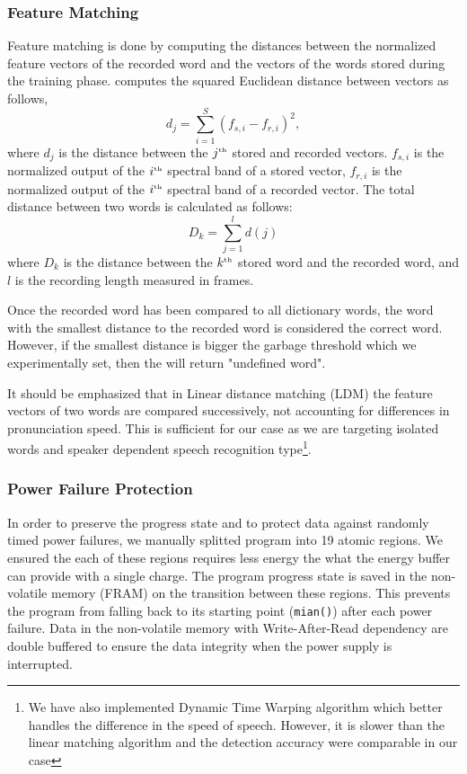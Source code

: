 \subsubsection{Feature Matching}
Feature matching is done by computing the distances between the normalized feature vectors of the recorded word and the vectors of the words stored during the training phase. 
\cim computes the squared Euclidean distance between vectors as follows,
\begin{equation}
	 	d_j = \sum\limits^S_{i=1} (f_{s,i} - f_{r,i})^2,
    \label{eq:frame_dist}
\end{equation}
where $d_j$ is the distance between the $j^{\text{\tiny th}}$ stored and recorded vectors. $f_{s,i}$ is the normalized output of the $i^{\text{\tiny th}}$ spectral band of a stored vector, $f_{r,i}$ is the normalized output of the $i^{\text{\tiny th}}$ spectral band of a recorded vector. 
The total distance between two words is calculated as follows:
\begin{equation}
		D_k = \sum\limits^{l}_{j=1} d(j)
\end{equation}
where $D_k$ is the distance between the $k^{\text{\tiny th}}$ stored word and the recorded word, and $l$ is the recording length measured in frames.

Once the recorded word has been compared to all \cim dictionary words, the word with the smallest distance to the recorded word is considered the correct word. However, if the smallest distance is bigger the garbage threshold  which we experimentally set, then the \cim will return "undefined word". 

It should be emphasized that in Linear distance matching (LDM) the feature vectors of two words are compared successively, not accounting for differences in pronunciation speed. This is sufficient for our case as we are targeting isolated words and speaker dependent speech recognition type\footnote{We have also implemented Dynamic Time Warping algorithm which better handles the difference in the speed of speech. However, it is slower than the linear matching algorithm and the detection accuracy were comparable in our case}. 

\subsubsection{Power Failure Protection}
In order to preserve the progress state and to protect \cim data against randomly timed power failures, we manually splitted \cim program into 19 atomic regions. We ensured the each of these regions requires less energy the what the energy buffer can provide with a single charge. The program progress state is saved in the non-volatile memory (FRAM) on the transition between these regions. This prevents the program from falling back to its starting point (\texttt{mian()}) after each power failure. Data in the non-volatile memory with Write-After-Read dependency are double buffered to ensure the data integrity when the power supply is interrupted. 

